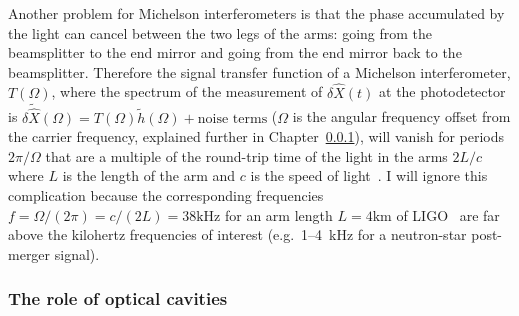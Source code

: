 Another problem for Michelson interferometers is that the phase accumulated by the light can cancel between the two legs of the arms: going from the beamsplitter to the end mirror and going from the end mirror back to the beamsplitter.
Therefore the signal transfer function of a Michelson interferometer, $T(\Omega)$, where the spectrum of the measurement of $\delta\hat{X}(t)$ at the photodetector is $\delta\tilde{\hat{X}}(\Omega) = T(\Omega) \tilde{h}(\Omega) + \text{noise terms}$ ($\Omega$ is the angular frequency offset from the carrier frequency, explained further in Chapter~\ref{}), will vanish for periods $2\pi/\Omega$ that are a multiple of the round-trip time of the light in the arms $2L/c$ where $L$ is the length of the arm and $c$ is the speed of light~\cite{}. 
I will ignore this complication because the corresponding frequencies $f=\Omega/(2\pi)=c/(2L)=38\mathrm{kHz}$ for an arm length $L=4\mathrm{km}$ of LIGO~\cite{} are far above the kilohertz frequencies of interest (e.g.\ 1--4~kHz for a neutron-star post-merger signal).

\subsubsection{The role of optical cavities}





